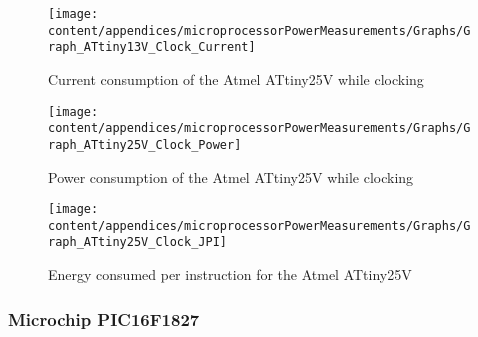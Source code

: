 \begin{figure}
\begin{centering}
\texttt{[image: content/appendices/microprocessorPowerMeasurements/Graphs/Graph\_ATtiny13V\_Clock\_Current]}
\par\end{centering}

\protect\caption{\label{fig:ATtiny25VClkCurrent}Current consumption of the Atmel ATtiny25V
while clocking}


\end{figure}
\begin{figure}
\begin{centering}
\texttt{[image: content/appendices/microprocessorPowerMeasurements/Graphs/Graph\_ATtiny25V\_Clock\_Power]}
\par\end{centering}

\protect\caption{
\label{fig:ATtiny25VClkPower}Power consumption of the Atmel ATtiny25V
while clocking
}


\end{figure}
\begin{figure}
\begin{centering}
\texttt{[image: content/appendices/microprocessorPowerMeasurements/Graphs/Graph\_ATtiny25V\_Clock\_JPI]}
\par\end{centering}

\protect\caption{
\label{fig:ATtiny25VClkJPI}Energy consumed per instruction for the
Atmel ATtiny25V
}


\end{figure}



\subsubsection{Microchip PIC16F1827}

